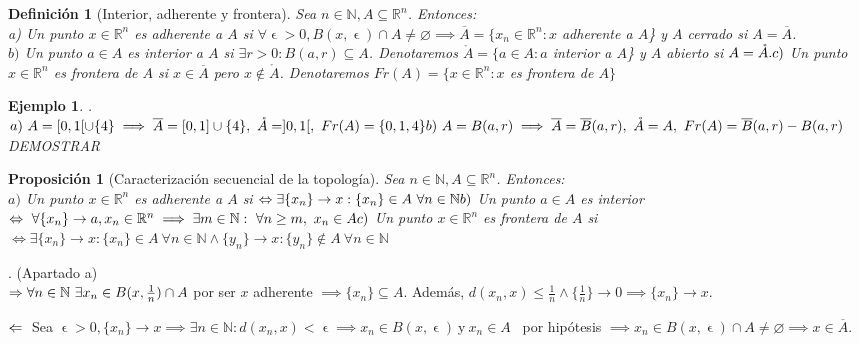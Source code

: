 \documentclass[11pt, a4paper]{article}
\makeatletter
\newif\IfInSansMode
\let\oldsf\sffamily
\renewcommand*{\sffamily}{\oldsf\mathversion{sans}\InSansModetrue}
\let\oldnorm\normalfont
\renewcommand*{\normalfont}{\oldnorm\InSansModefalse\mathversion{normal}}
\let\epsilon\upvarepsilon
\newcommand{\R}{\mathbb{R}} \newcommand{\N}{\mathbb{N}}
\renewenvironment{proof}[1][\proofname] {\par\pushQED{\qed}\normalfont\topsep6\p@\@plus6\p@\relax\trivlist\item[\hskip\labelsep\itshape\sffamily#1\@addpunct{.}]\ignorespaces}{\popQED\endtrivlist\@endpefalse}
\theoremstyle{theorem-style}
\newtheorem{nprop}{Proposición}[section]
\theoremstyle{definition-style}
\newtheorem{ndef}{Definición}[section]
\theoremstyle{remark-style}
\theoremstyle{example-style}
\newtheorem{ejemplo}{Ejemplo}[section]
\makeatother
\begin{document}
\begin{ndef}[Interior, adherente y frontera]
Sea $n \in \N, A \subseteq \R^n$. Entonces: \\
a) Un punto $x \in \R^n$ es adherente a $A$ si $ \forall \epsilon > 0, B(x,\epsilon) \cap A \ne \varnothing \implies \overline{A} = \{x_n \in \R^n: x $ adherente a $A$\} y $A$ cerrado si $A = \overline{A}$. \\
$b)$ Un punto $a \in A$ es interior a $A$ si $ \exists r > 0: B(a,r) \subseteq A$. Denotaremos $\mathring{A} = \{a \in A: a $ interior a $A$\} y $A$ abierto si $A = \mathring{A}. \\
c)$ Un punto $x \in \R^n$ es frontera de $A$ si $x \in \overline{A}$ pero $x \not\in \mathring{A}$. Denotaremos $Fr(A) = \{x \in \R^n: x$ es frontera de $A\}$
\end{ndef}

\begin{ejemplo}.
\\ $ a) \ A = [0,1[ \cup \{4\} \implies \overline{A} = [0,1] \cup \{4\}, \ \mathring{A} = ]0,1[, \ Fr(A) = \{0,1,4\} \\
b) \ A = B(a,r) \implies \overline{A} = \overline{B}(a,r), \ \mathring{A} = A, \ Fr(A) = \overline{B}(a,r)- B(a,r)$ DEMOSTRAR
\end{ejemplo}

\begin{nprop}[Caracterización secuencial de la topología]
Sea $n \in \N, A \subseteq \R^n$. Entonces: \\
$a)$ Un punto $x \in \R^n$ es adherente a $A$ si $ \Leftrightarrow \exists \{x_n\} \rightarrow x: \{x_n\} \in A \ \forall n \in \N \\
b) $ Un punto $a \in A$ es interior $ \Leftrightarrow \ \forall \{x_n\} \rightarrow a, x_n \in \R^n \implies \exists m \in \N: \ \forall n \ge m, \ x_n \in A \\
c) $ Un punto $x \in \R^n$ es frontera de $A$ si $ \Leftrightarrow \exists \{x_n\} \rightarrow x: \{x_n\} \in A \ \forall n \in \N \land \{y_n\} \rightarrow x: \{y_n\} \not\in A \ \forall n \in \N $
\end{nprop}

\begin{proof}.
(Apartado a) \\ $ \Rightarrow \\ \forall n \in \N \ \exists x_n \in B(x,\frac{1}{n}) \cap A$ por ser $x$ adherente $ \implies \{x_n\} \subseteq A$. Además, $d(x_n,x) \le \frac{1}{n} \land \{\frac{1}{n}\} \rightarrow 0 \implies \{x_n\} \rightarrow x. $ 

$\Leftarrow \\ $ Sea $ \epsilon > 0, \{x_n\} \rightarrow x \implies \exists n \in \N: d(x_n,x) < \epsilon \implies x_n \in B(x,\epsilon) \ $y$ \ x_n \in A $ \ por hipótesis $ \implies x_n \in B(x,\epsilon) \cap A \ne \varnothing \implies x \in \overline{A}$. \\
\end{proof}
\end{document}

